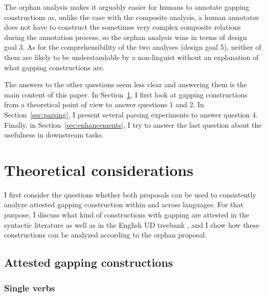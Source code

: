 \documentclass[lucida,biblatex]{sp} %
\begin{document}
The {\sc orphan} analysis makes it arguably easier for humans to annotate gapping constructions as, unlike the case with the {\sc composite} analysis, a human annotator does not have to construct the sometimes very complex composite relations during the annotation process, so the {\sc orphan} analysis wins in terms of design goal 3. As for the comprehensibility of the two analyses (design goal 5), neither of them are likely to be understandable by a non-linguist  without an explanation of what gapping constructions are.

The answers to the other questions seem less clear and answering them is the main content of this paper. In Section~\ref{sec:theoretical}, I first look at gapping constructions from a theoretical point of view to answer questions 1 and 2.  In Section~\ref{sec:parsing}, I present several parsing experiments to answer question 4. Finally, in Section~\ref{sec:enhancements}, I try to answer the last question about the usefulness in downstream tasks. 



\section{Theoretical considerations}
\label{sec:theoretical}

I first consider the questions whether both proposals can be used to consistently analyze attested gapping construction within and across languages. For that purpose, I discuss what kind of constructions with gapping are attested in the syntactic literature as well as in the English UD treebank \citep{Silveira2014,Nivre2017a,Nivre2017b}, and I show how these constructions can be analyzed according to the {\sc orphan} proposal. 

\subsection{Attested gapping constructions}

\subsubsection{Single verbs}
\end{document}
